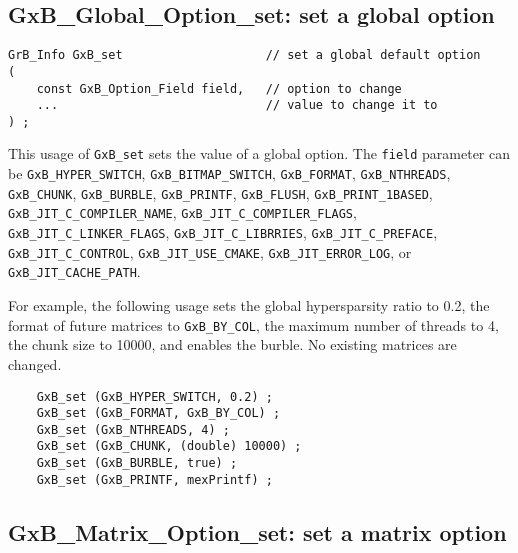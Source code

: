 \documentclass[12pt]{article}
\begin{document}
\subsection{{\sf GxB\_Global\_Option\_set:} set a global option}

\begin{mdframed}[userdefinedwidth=6in]
{\footnotesize
\begin{verbatim}
GrB_Info GxB_set                    // set a global default option
(
    const GxB_Option_Field field,   // option to change
    ...                             // value to change it to
) ;
\end{verbatim} } \end{mdframed}

This usage of \verb'GxB_set' sets the value of a global option.
The \verb'field' parameter can be
\verb'GxB_HYPER_SWITCH',
\verb'GxB_BITMAP_SWITCH',
\verb'GxB_FORMAT',
\verb'GxB_NTHREADS',
\verb'GxB_CHUNK',
\verb'GxB_BURBLE',
\verb'GxB_PRINTF',
\verb'GxB_FLUSH',
\verb'GxB_PRINT_1BASED', \newline
\verb'GxB_JIT_C_COMPILER_NAME',
\verb'GxB_JIT_C_COMPILER_FLAGS',
\verb'GxB_JIT_C_LINKER_FLAGS',
\verb'GxB_JIT_C_LIBRRIES',
\verb'GxB_JIT_C_PREFACE',
\verb'GxB_JIT_C_CONTROL',
\verb'GxB_JIT_USE_CMAKE',
\verb'GxB_JIT_ERROR_LOG', or
\verb'GxB_JIT_CACHE_PATH'.

For example, the following usage sets the global hypersparsity ratio to 0.2,
the format of future matrices to \verb'GxB_BY_COL', the maximum number
of threads to 4, the chunk size to 10000, and enables the burble.
No existing matrices are changed.

{\footnotesize
\begin{verbatim}
    GxB_set (GxB_HYPER_SWITCH, 0.2) ;
    GxB_set (GxB_FORMAT, GxB_BY_COL) ;
    GxB_set (GxB_NTHREADS, 4) ;
    GxB_set (GxB_CHUNK, (double) 10000) ;
    GxB_set (GxB_BURBLE, true) ;
    GxB_set (GxB_PRINTF, mexPrintf) ;
\end{verbatim} }

\newpage
\subsection{{\sf GxB\_Matrix\_Option\_set:} set a matrix option}
\end{document}
